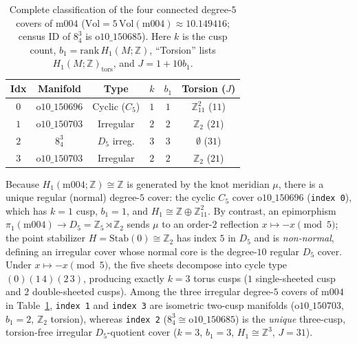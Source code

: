 \documentclass[aps,prd,twocolumn,nofootinbib,floatfix]{revtex4-2}
\begin{document}
\begin{table}[b]
\caption{Complete classification of the four connected degree-$5$ covers of $\mathrm{m004}$ ($\mathrm{Vol} = 5\,\mathrm{Vol}(\mathrm{m004}) \approx 10.149416$; census ID of $8^3_4$ is $\mathrm{o10\_150685}$). Here $k$ is the cusp count, $b_1 = \mathrm{rank}\,H_1(M;\mathbb{Z})$, ``Torsion'' lists $H_1(M;\mathbb{Z})_{\mathrm{tors}}$, and $J = 1 + 10b_1$.}
\label{tab:covers}
\begin{ruledtabular}
\begin{tabular}{cccccc}
Idx & Manifold & Type & $k$ & $b_1$ & Torsion ($J$) \\
\hline
$0$ & $\mathrm{o10\_150696}$ & Cyclic ($C_5$) & $1$ & $1$ & $\mathbb{Z}_{11}^2$ ($11$) \\
$1$ & $\mathrm{o10\_150703}$ & Irregular & $2$ & $2$ & $\mathbb{Z}_2$ ($21$) \\
$2$ & $8^3_4$ & $D_5$ irreg. & $3$ & $3$ & $\emptyset$ ($31$) \\
$3$ & $\mathrm{o10\_150703}$ & Irregular & $2$ & $2$ & $\mathbb{Z}_2$ ($21$) \\
\end{tabular}
\end{ruledtabular}
\end{table}

Because $H_1(\mathrm{m004};\mathbb{Z}) \cong \mathbb{Z}$ is generated by the knot meridian $\mu$, there is a unique regular (normal) degree-$5$ cover: the cyclic $C_5$ cover $\mathrm{o10\_150696}$ (\texttt{index 0}), which has $k = 1$ cusp, $b_1 = 1$, and $H_1 \cong \mathbb{Z} \oplus \mathbb{Z}_{11}^2$.
By contrast, an epimorphism $\pi_1(\mathrm{m004}) \to D_5 = \mathbb{Z}_5 \rtimes \mathbb{Z}_2$ sends $\mu$ to an order-$2$ reflection $x \mapsto -x \pmod 5$; the point stabilizer $H = \mathrm{Stab}(0) \cong \mathbb{Z}_2$ has index $5$ in $D_5$ and is \emph{non-normal}, defining an irregular cover whose normal core is the degree-$10$ regular $D_5$ cover.
Under $x \mapsto -x \pmod 5$, the five sheets decompose into cycle type $(0)(1\,4)(2\,3)$, producing exactly $k = 3$ torus cusps ($1$ single-sheeted cusp and $2$ double-sheeted cusps).
Among the three irregular degree-$5$ covers of $\mathrm{m004}$ in Table~\ref{tab:covers}, \texttt{index 1} and \texttt{index 3} are isometric two-cusp manifolds ($\mathrm{o10\_150703}$, $b_1 = 2$, $\mathbb{Z}_2$ torsion), whereas \texttt{index 2} ($8^3_4 \cong \mathrm{o10\_150685}$) is the \emph{unique} three-cusp, torsion-free irregular $D_5$-quotient cover ($k = 3$, $b_1 = 3$, $H_1 \cong \mathbb{Z}^3$, $J = 31$).
\end{document}
